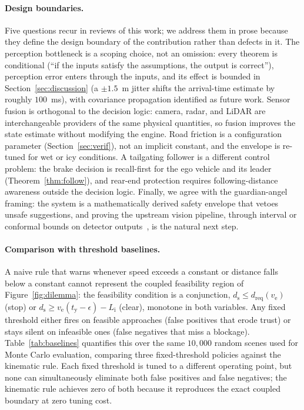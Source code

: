 \documentclass[conference, a4paper]{IEEEtran}
\theoremstyle{plain}
\newcommand{\dreq}{d_{\mathrm{req}}}
\newcommand{\ds}{d_{\mathrm{s}}}
\newcommand{\tred}{t_{\mathrm{y}}}
\newcommand{\Li}{L_{\mathrm{i}}}
\newcommand{\ve}{v_{\mathrm{e}}}
\begin{document}
\paragraph{Design boundaries.} Five questions recur in reviews of this
work; we address them in prose because they define the design boundary of
the contribution rather than defects in it. The perception bottleneck is a
scoping choice, not an omission: every theorem is conditional (``if the
inputs satisfy the assumptions, the output is correct''), perception error
enters through the inputs, and its effect is bounded in
Section~\ref{sec:discussion} (a $\pm 1.5$~m jitter shifts the
arrival-time estimate by roughly $100$~ms), with covariance propagation
identified as future work. Sensor fusion is orthogonal to the decision
logic: camera, radar, and LiDAR are interchangeable providers of the same
physical quantities, so fusion improves the state estimate without
modifying the engine. Road friction is a configuration parameter
(Section~\ref{sec:verif}), not an implicit constant, and the envelope is
re-tuned for wet or icy conditions. A tailgating follower is a different
control problem: the brake decision is recall-first for the ego vehicle and
its leader (Theorem~\ref{thm:follow}), and rear-end protection requires
following-distance awareness outside the decision logic. Finally, we agree
with the guardian-angel framing: the system is a mathematically derived safety
envelope that vetoes unsafe suggestions, and proving the upstream vision
pipeline, through interval or conformal bounds on detector
outputs~\cite{vovk2005}, is the natural next step.

\paragraph{Comparison with threshold baselines.} A naive rule that warns
whenever speed exceeds a constant or distance falls below a constant cannot
represent the coupled feasibility region of Figure~\ref{fig:dilemma}: the
feasibility condition is a conjunction, $\ds \leq \dreq(\ve)$ (stop) or
$\ds \geq \ve(\tred-\epsilon)-\Li$ (clear), monotone in both variables.
Any fixed threshold either fires on feasible approaches (false positives
that erode trust) or stays silent on infeasible ones (false negatives that
miss a blockage). Table~\ref{tab:baselines} quantifies this over the same
$10{,}000$ random scenes used for Monte Carlo evaluation, comparing
three fixed-threshold policies against the kinematic rule. Each fixed
threshold is tuned to a different operating point, but none can
simultaneously eliminate both false positives and false negatives; the
kinematic rule achieves zero of both because it reproduces the exact
coupled boundary at zero tuning cost.
\end{document}
